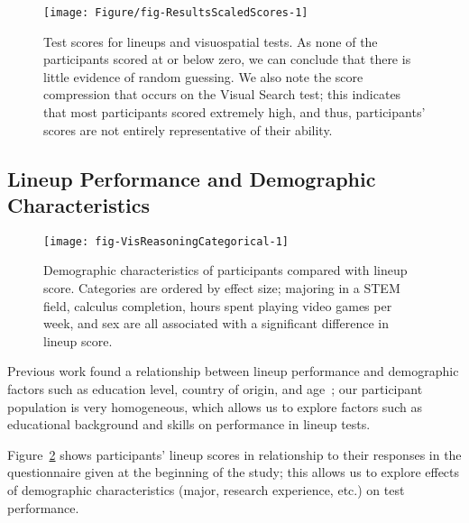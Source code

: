 \documentclass[journal]{vgtc}\usepackage[]{graphicx}\usepackage[]{color}
\begin{document}
\begin{figure}[ht]
\centering
\texttt{[image: Figure/fig-ResultsScaledScores-1]}
\caption{Test scores for lineups and visuospatial tests. As none of the participants scored at or below zero, we can conclude that there is little evidence of random guessing. We also note the score compression that occurs on the Visual Search test; this indicates that most participants scored extremely high, and thus, participants' scores are not entirely representative of their ability. \label{fig:Scores}}
\end{figure}
% 



\subsection{Lineup Performance and Demographic Characteristics}


\begin{figure}[h!tb]\centering
\texttt{[image: fig-VisReasoningCategorical-1]}
\caption[Visual Aptitude Study Results]{Demographic characteristics of participants compared with lineup score. Categories are ordered by effect size; majoring in a STEM field, calculus completion, hours spent playing video games per week, and sex are all associated with a significant difference in lineup score. }\label{fig:visualaptitudecat}
\end{figure}

Previous work found a relationship between lineup performance and demographic factors such as education level, country of origin, and age~\cite{humanfactorslineups}; our participant population is very homogeneous, which allows us to explore factors such as educational background and skills on performance in lineup tests. 

Figure~\ref{fig:visualaptitudecat} shows participants' lineup scores in relationship to their responses in the questionnaire given at the beginning of the study; this allows us to explore effects of demographic characteristics (major, research experience, etc.) on test performance. 
\end{document}
